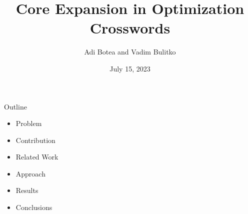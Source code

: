 \documentclass[aspectratio=169,usenames,dvipsnames]{beamer}
\newcommand{\bei}{\begin{itemize}}
\newcommand{\eei}{\end{itemize}}
\newcommand{\ie}{\item}
\numberwithin{equation}{section}
\numberwithin{theorem}{section}
\numberwithin{lem}{section}
\numberwithin{df}{section}
\begin{document}
\title{Core Expansion in Optimization Crosswords}
\author{Adi Botea and Vadim Bulitko}

\date{July 15, 2023}

\frame{\titlepage} 


\begin{frame}{Outline}

\bei

\ie Problem

\bigskip

\ie Contribution

\bigskip

\ie Related Work

\bigskip

\ie Approach

\bigskip

\ie Results

\bigskip

\ie Conclusions

\eei

\end{frame}

\end{document}
